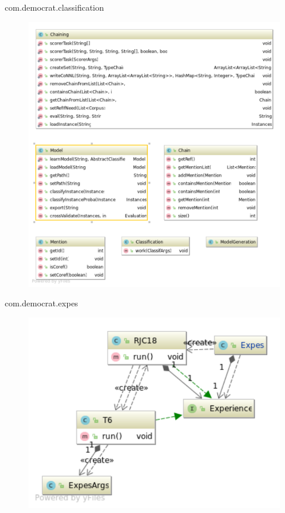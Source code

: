 \documentclass[a4paper,10pt]{report}
\begin{document}
 \pagebreak
 \begin{section}{com.democrat.classification}  
     \begin{figure}[!htbp]      
      \centering
      \includegraphics[width=1.2\linewidth, keepaspectratio]{Package_classification.pdf}
     \end{figure}
     \vfill
  \end{section}
  
 \pagebreak
 \begin{section}{com.democrat.expes}  
     \begin{figure}[!htbp]      
      \centering
      \includegraphics[width=0.7\linewidth, keepaspectratio]{Package_expes.pdf}
     \end{figure}
     \vfill
  \end{section}
\end{document}
